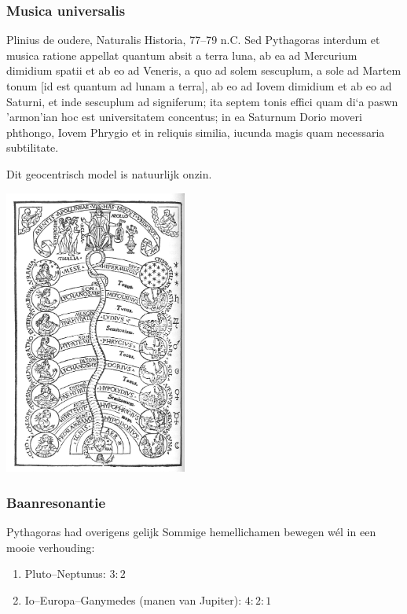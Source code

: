 \documentclass[compress, darktitle, framenumber, totalframenumber]{beamer}
\newenvironment{danger}{\medbreak\noindent\hangindent=2pc\hangafter=-2%
  \clubpenalty=10000%
  \hbox to0pt{\hskip-\hangindent\dbend\hfill}\small\ignorespaces}%
  {\medbreak\par}
\begin{document}
\begin{frame}
  \frametitle{Musica universalis}

  \begin{block}{Plinius de oudere, Naturalis Historia, 77--79 n.C.}
    Sed Pythagoras interdum et musica ratione appellat quantum absit a terra luna, ab ea ad Mercurium dimidium spatii et ab eo ad Veneris, a quo ad solem sescuplum, a sole ad Martem tonum [id est quantum ad lunam a terra], ab eo ad Iovem dimidium et ab eo ad Saturni, et inde sescuplum ad signiferum; ita septem tonis effici quam \greektext di`a paswn 'armon'ian \latintext hoc est universitatem concentus; in ea Saturnum Dorio moveri phthongo, Iovem Phrygio et in reliquis similia, iucunda magis quam necessaria subtilitate.
  \end{block}

  \pause

  Dit \alert{geocentrisch model} is natuurlijk onzin.
\end{frame}

\begin{frame}[plain]
  \centering
  \includegraphics[width=6cm]{images/spheres}
\end{frame}

\begin{frame}
  \frametitle{Baanresonantie}

  \begin{block}{Pythagoras had overigens gelijk}
    Sommige hemellichamen bewegen w\'el in een mooie verhouding:
    \begin{enumerate}
      \item Pluto--Neptunus: $3:2$
      \item Io--Europa--Ganymedes (manen van Jupiter): $4:2:1$
    \end{enumerate}
  \end{block}

  \pause

\end{frame}
\end{document}
